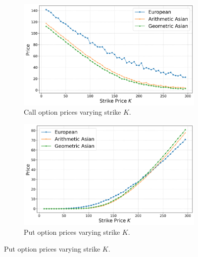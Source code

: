 \begin{figure}[h]
    \centering
\begin{subfigure}[b]{0.45\linewidth}
    \centering
    \includegraphics[width=\linewidth]{graphics/arithmetic_call_prices_K.png}
    \caption{Call option prices varying strike $K$.}
    \label{fig:arith_call_k}
\end{subfigure}
\hfill
\begin{subfigure}[b]{0.45\linewidth}
    \centering
    \includegraphics[width=\linewidth]{graphics/arithmetic_put_prices_K.png}
    \caption{Put option prices varying strike $K$.}
    \label{fig:arith_put_k}
\end{subfigure}

\vspace{0.5cm}


\end{figure}
